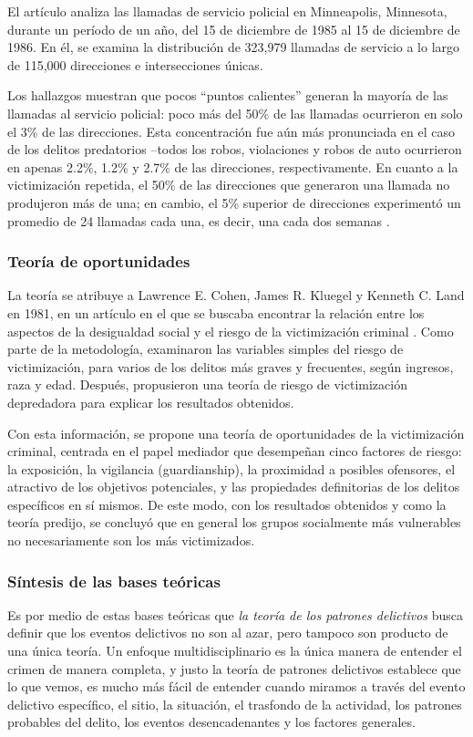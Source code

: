 El artículo analiza las llamadas de servicio policial en Minneapolis, Minnesota, durante un período de un año, del 15 de diciembre de 1985 al 15 de diciembre de 1986. En él, se examina la distribución de 323,979 llamadas de servicio a lo largo de 115,000 direcciones e intersecciones únicas.

Los hallazgos muestran que pocos ``puntos calientes'' generan la mayoría de las llamadas al servicio policial: poco más del 50\% de las llamadas ocurrieron en solo el 3\% de las direcciones. Esta concentración fue aún más pronunciada en el caso de los delitos predatorios --todos los robos, violaciones y robos de auto ocurrieron en apenas 2.2\%, 1.2\% y 2.7\% de las direcciones, respectivamente. En cuanto a la victimización repetida, el 50\% de las direcciones que generaron una llamada no produjeron más de una; en cambio, el 5\% superior de direcciones experimentó un promedio de 24 llamadas cada una, es decir, una cada dos semanas \cite{sherman1989}.


\subsubsection{Teoría de oportunidades}
La teoría se atribuye a Lawrence E. Cohen, James R. Kluegel y Kenneth C. Land en 1981, en un artículo en el que se buscaba encontrar la relación entre los aspectos de la desigualdad social y el riesgo de la victimización criminal \cite{cohenkluegelland1981}. Como parte de la metodología, examinaron las variables simples del riesgo de victimización, para varios de los delitos más graves y frecuentes, según ingresos, raza y edad. Después, propusieron una teoría de riesgo de victimización depredadora para explicar los resultados obtenidos.

Con esta información, se propone una teoría de oportunidades de la victimización criminal, centrada en el papel mediador que desempeñan cinco factores de riesgo: la exposición, la vigilancia (guardianship), la proximidad a posibles ofensores, el atractivo de los objetivos potenciales, y las propiedades definitorias de los delitos específicos en sí mismos. De este modo, con los resultados obtenidos y como la teoría predijo, se concluyó que en general los grupos socialmente más vulnerables no necesariamente son los más victimizados\cite{cohenkluegelland1981}.

\subsubsection{Síntesis de las bases teóricas}
Es por medio de estas bases teóricas que \textit{la teoría de los patrones delictivos} busca definir que los eventos delictivos no son al azar, pero tampoco son producto de una única teoría. Un enfoque multidisciplinario es la única manera de entender el crimen de manera completa, y justo la teoría de patrones delictivos establece que lo que vemos, es mucho más fácil de entender cuando miramos a través del evento delictivo específico, el sitio, la situación, el trasfondo de la actividad, los patrones probables del delito, los eventos desencadenantes y los factores generales\cite[p.~284]{brantingham1993}.

